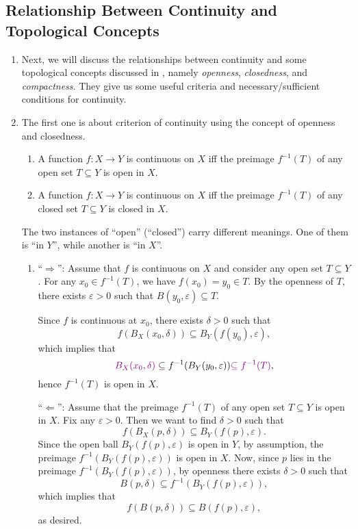 \subsection{Relationship Between Continuity and Topological Concepts}
\begin{enumerate}
\item Next, we will discuss the relationships between continuity and some
topological concepts discussed in , namely
\emph{openness}, \emph{closedness}, and \emph{compactness}. They give us some
useful criteria and necessary/sufficient conditions for continuity.

\item The first one is about criterion of continuity using the concept of
openness and closedness.

\begin{theorem}
\label{thm:cts-crit-open-closed}
\hfill
\begin{enumerate}
\item A function \(f:X\to Y\) is continuous on \(X\) iff the preimage \(f^{-1}(T)\)
of any open set \(T\subseteq Y\) is open in \(X\).
\item A function \(f:X\to Y\) is continuous on \(X\) iff the preimage \(f^{-1}(T)\)
of any closed set \(T\subseteq Y\) is closed in \(X\).
\end{enumerate}
\end{theorem}
\begin{note}
The two instances of ``open'' (``closed'') carry different meanings. One of
them is ``in \(Y\)'', while another is ``in \(X\)''.
\end{note}

\begin{pf}
\hfill
\begin{enumerate}
\item ``\(\Rightarrow\)'': Assume that \(f\) is continuous on \(X\) and
consider any open set \(T\subseteq Y\). For any \(x_0\in f^{-1}(T)\), we have
\(f(x_0)=y_0\in T\). By the openness of \(T\), there exists \(\varepsilon>0\)
such that \(B(y_0,\varepsilon)\subseteq T\).

Since \(f\) is continuous at \(x_0\), there exists \(\delta>0\) such that
\[
f(B_X(x_0,\delta))\subseteq B_Y(f(y_0),\varepsilon),
\]
which implies that
\[
{\color{violet}B_X(x_0,\delta)}\subseteq f^{-1}(B_Y(y_0,\varepsilon)){\color{violet}\subseteq f^{-1}(T)},
\]
hence \(f^{-1}(T)\) is open in \(X\).

``\(\Leftarrow\)'': Assume that the preimage \(f^{-1}(T)\)
of any open set \(T\subseteq Y\) is open in \(X\). Fix any \(\varepsilon>0\).
Then we want to find \(\delta>0\) such that
\[
f(B_X(p,\delta))\subseteq B_Y(f(p),\varepsilon).
\]
Since the open ball \(B_Y(f(p),\varepsilon)\) is open in \(Y\), by assumption,
the preimage \(f^{-1}(B_Y(f(p),\varepsilon))\) is open in \(X\). Now, since
\(p\) lies in the preimage \(f^{-1}(B_Y(f(p),\varepsilon))\), by openness
there exists \(\delta>0\) such that
\[
B(p,\delta)\subseteq f^{-1}(B_Y(f(p),\varepsilon)),
\]
which implies that
\[
f(B(p,\delta))\subseteq B(f(p),\varepsilon),
\]
as desired.


\end{enumerate}
\end{pf}
\end{enumerate}

